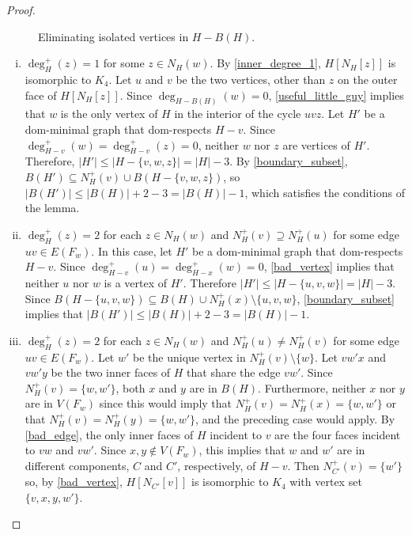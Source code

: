 \documentclass{article}
\theoremstyle{definition}
\begin{document}
\begin{proof}
\begin{figure}
    \caption{Eliminating isolated vertices in $H-B(H)$.}
    \label{isolated_fig}
  \end{figure}
  \begin{enumerate}[(i)]
    \item $\deg^+_H(z)=1$ for some $z\in N_H(w)$. By \cref{inner_degree_1}, $H[N_H[z]]$ is isomorphic to $K_4$.  Let $u$ and $v$ be the two vertices, other than $z$ on the outer face of $H[N_H[z]]$.  Since $\deg_{H-B(H)}(w)=0$, \cref{useful_little_guy} implies that $w$ is the only vertex of $H$ in the interior of the cycle $uvz$. Let $H'$ be a dom-minimal graph that dom-respects $H-v$.  Since $\deg^+_{H-v}(w)=\deg^+_{H-v}(z)=0$, neither $w$ nor $z$ are vertices of $H'$. Therefore, $|H'|\le |H-\{v,w,z\}|=|H|-3$.  By \cref{boundary_subset}, $B(H')\subseteq N^+_H(v)\cup B(H-\{v,w,z\})$, so $|B(H')|\le |B(H)|+2-3=|B(H)|-1$, which satisfies the conditions of the lemma.

    \item $\deg^+_H(z)=2$ for each $z\in N_H(w)$ and $N^+_H(v)\supseteq N^+_H(u)$ for some edge $uv\in E(F_w)$.  In this case, let $H'$ be a dom-minimal graph that dom-respects $H-v$. Since $\deg^+_{H-v}(u)=\deg^+_{H-x}(w)=0$, \cref{bad_vertex} implies that neither $u$ nor $w$ is a vertex of $H'$.  Therefore $|H'|\le |H-\{u,v,w\}|=|H|-3$.  Since $B(H-\{u,v,w\})\subseteq B(H)\cup N^+_{H}(x)\setminus \{u,v,w\}$, \cref{boundary_subset} implies that $|B(H')|\le |B(H)|+2-3=|B(H)|-1$.

    \item $\deg^+_H(z)=2$ for each $z\in N_H(w)$ and $N^+_H(u)\neq N^+_H(v)$ for some edge $uv\in E(F_w)$.  Let $w'$ be the unique vertex in $N^+_H(v)\setminus\{w\}$.  Let $vw'x$ and $vw'y$ be the two inner faces of $H$ that share the edge $vw'$.  Since $N^+_H(v)=\{w,w'\}$, both $x$ and $y$ are in $B(H)$. Furthermore, neither $x$ nor $y$ are in $V(F_w)$ since this would imply that $N^+_H(v)= N^+_H(x)=\{w,w'\}$ or that $N^+_H(v)= N^+_H(y)=\{w,w'\}$, and the preceding case would apply.
    By \cref{bad_edge}, the only inner faces of $H$ incident to $v$ are the four faces incident to $vw$ and $vw'$.  Since $x,y\not\in V(F_w)$, this implies that $w$ and $w'$ are in different components, $C$ and $C'$, respectively, of $H-v$.  Then $N^+_{C'}(v)=\{w'\}$ so, by \cref{bad_vertex}, $H[N_{C'}[v]]$ is isomorphic to $K_4$ with vertex set $\{v,x,y,w'\}$.


\end{enumerate}
\end{proof}
\end{document}
